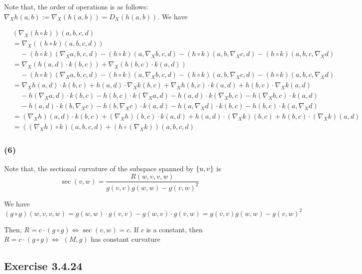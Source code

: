 Note that, the order of operations is as follows: $\nabla_X h(a, b) := \nabla_X(h(a, b)) = D_X (h(a, b))$. We have

\begin{align*}
	&(\nabla_X (h \circ k))(a, b, c, d) \\
	&= \nabla_X ((h \circ k)(a, b, c, d)) \\ 
	&\;\;\;\; - (h \circ k)(\nabla_X a, b, c, d) - (h \circ k)(a, \nabla_X b, c, d) - (h \circ k)(a, b, \nabla_X c, d) - (h \circ k)(a, b, c, \nabla_X d) \\
	&= \nabla_X (h(a, d)  \cdot k(b, c)) + \nabla_X (h(b, c)  \cdot k(a, d)) \\ 
	&\;\;\;\; - (h \circ k)(\nabla_X a, b, c, d) - (h \circ k)(a, \nabla_X b, c, d) - (h \circ k)(a, b, \nabla_X c, d) - (h \circ k)(a, b, c, \nabla_X d) \\
	&= \nabla_X h(a, d) \cdot  k(b, c) + h(a, d) \cdot  \nabla_X k(b, c) + \nabla_X h(b, c) \cdot  k(a, d) + h(b, c)  \cdot \nabla_X k(a, d) \\ 
	&\;\;\;\; - h(\nabla_X a, d)  \cdot  k(b, c) - h(b, c)  \cdot k (\nabla_X a, d)  - h(a, d)  \cdot k(\nabla_X b, c) - h(\nabla_X b, c)  \cdot k(a, d) \\
	&\;\;\;\; - h(a, d)  \cdot k(b, \nabla_X c) - h(b, \nabla_X c)  \cdot k(a, d) - h(a, \nabla_X d)  \cdot k(b, c) - h(b, c)  \cdot k(a, \nabla_X d) \\
	&= (\nabla_X h)(a, d)  \cdot k(b, c) + (\nabla_X h)(b, c)  \cdot k(a, d) + h(a, d)  \cdot (\nabla_X k)(b, c) + h(b, c) \cdot  (\nabla_X k)(a, d) \\
	&= ((\nabla_X h) \circ k)(a, b, c, d) + (h \circ (\nabla_X k))(a, b, c, d)
\end{align*}

\subsubsection{(6)}

Note that, the sectional curvature of the subspace spanned by $\{u, v\}$ is
$$
	\sec(v, w) = \frac{R(w, v, v, w)}{g(v, v) g(w, w) - g(v, w)^2}
$$

We have
$$
	(g \circ g)(w, v, v, w)
	= g(w, w) \cdot g(v, v) - g(w, v) \cdot g(v, w)
	= g(v, v) g(w, w) - g(v, w)^2
$$

Then, $R = c \cdot (g \circ g) \iff \sec(v, w) = c$. If $c$ is a constant, then $R = c \cdot (g \circ g) \iff$ $(M, g)$ has constant curvature

\subsection{Exercise 3.4.24}


